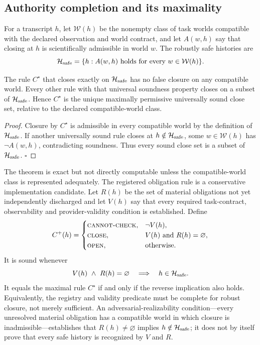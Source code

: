 \subsection{Authority completion and its maximality}

For a transcript $h$, let $\mathcal W(h)$ be the nonempty class of task worlds
compatible with the declared observation and world contract, and let
$A(w,h)$ say that closing at $h$ is scientifically admissible in world $w$.
The robustly safe histories are
\[
 \mathcal H_{\rm safe}
 =\{h:\text{$A(w,h)$ holds for every $w\in\mathcal W(h)$}\}.
\]

\begin{theorem}
\label{thm:maximal-completion}
The rule $C^\star$ that closes exactly on $\mathcal H_{\rm safe}$ has no false
closure on any compatible world. Every other rule with that universal soundness
property closes on a subset of $\mathcal H_{\rm safe}$. Hence $C^\star$ is the
unique maximally permissive universally sound close set, relative to the
declared compatible-world class.
\end{theorem}

\begin{proof}
Closure by $C^\star$ is admissible in every compatible world by the definition
of $\mathcal H_{\rm safe}$. If another universally sound rule closes at
$h\notin\mathcal H_{\rm safe}$, some $w\in\mathcal W(h)$ has $\neg A(w,h)$,
contradicting soundness. Thus every sound close set is a subset of
$\mathcal H_{\rm safe}$. \hfill$\square$
\end{proof}

The theorem is exact but not directly computable unless the compatible-world
class is represented adequately. The registered obligation rule is a
conservative implementation candidate. Let $R(h)$ be the set of material
obligations not yet independently discharged and let $V(h)$ say that every
required task-contract, observability and provider-validity condition is
established. Define
\[
 C^+(h)=
 \begin{cases}
  \textsc{cannot-check}, & \neg V(h),\\
  \textsc{close}, & V(h)\ \text{and}\ R(h)=\varnothing,\\
  \textsc{open}, & \text{otherwise}.
 \end{cases}
\]
It is sound whenever
\[
 V(h)\ \wedge\ R(h)=\varnothing\quad\Longrightarrow\quad
 h\in\mathcal H_{\rm safe}.
\]
It equals the maximal rule $C^\star$ if and only if the reverse implication
also holds. Equivalently, the registry and validity predicate must be complete
for robust closure, not merely sufficient. An adversarial-realizability
condition---every unresolved material obligation has a compatible world in
which closure is inadmissible---establishes that $R(h)\ne\varnothing$ implies
$h\notin\mathcal H_{\rm safe}$; it does not by itself prove that every safe
history is recognized by $V$ and $R$.

